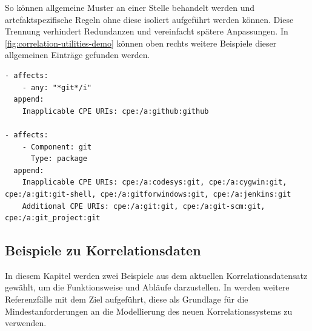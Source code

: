So können allgemeine Muster an einer Stelle behandelt werden und artefaktspezifische Regeln ohne diese isoliert aufgeführt werden können.
Diese Trennung verhindert Redundanzen und vereinfacht spätere Anpassungen.
In \autoref{fig:correlation-utilities-demo} können oben rechts weitere Beispiele dieser allgemeinen Einträge gefunden werden.

\begin{lstlisting}[style=yaml,caption={Inkrementelle Korrelationseinträge für das Kommandozeilentool git},label={lst:correlation-incremental-git-example}]
- affects:
    - any: "*git*/i"
  append:
    Inapplicable CPE URIs: cpe:/a:github:github

- affects:
    - Component: git
      Type: package
  append:
    Inapplicable CPE URIs: cpe:/a:codesys:git, cpe:/a:cygwin:git, cpe:/a:git:git-shell, cpe:/a:gitforwindows:git, cpe:/a:jenkins:git
    Additional CPE URIs: cpe:/a:git:git, cpe:/a:git-scm:git, cpe:/a:git_project:git
\end{lstlisting}

\subsection{Beispiele zu Korrelationsdaten}

In diesem Kapitel werden zwei Beispiele aus dem aktuellen Korrelationsdatensatz gewählt, um die Funktionsweise und Abläufe darzustellen.
In \label{sec:reference-case-chapter} werden weitere Referenzfälle mit dem Ziel aufgeführt, diese als Grundlage für die Mindestanforderungen an die Modellierung des neuen Korrelationssystems zu verwenden.

